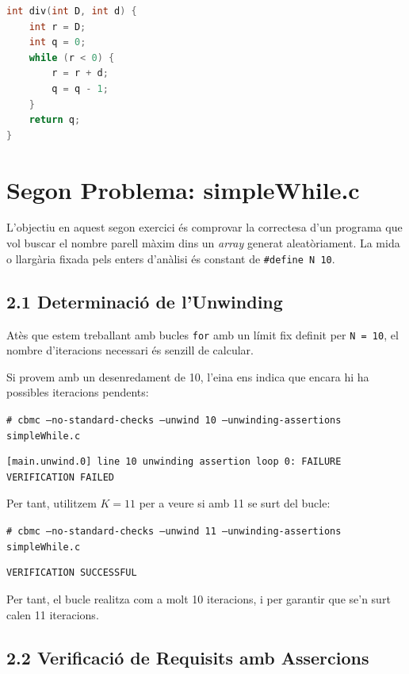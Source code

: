 \documentclass[12pt,a4paper]{article}
\begin{document}
\begin{lstlisting}[language=C]
int div(int D, int d) {
    int r = D;
    int q = 0;
    while (r < 0) {
        r = r + d;
        q = q - 1;
    }
    return q;
}
\end{lstlisting}

\section{Segon Problema: simpleWhile.c}

L'objectiu en aquest segon exercici és comprovar la correctesa d'un programa que vol buscar el nombre parell màxim dins un \textit{array} generat aleatòriament. La mida o llargària fixada pels enters d'anàlisi és constant de \texttt{\#define N 10}.

\subsection{2.1 Determinació de l'Unwinding}

Atès que estem treballant amb bucles \texttt{for} amb un límit fix definit per \texttt{N = 10}, el nombre d'iteracions necessari és senzill de calcular.

Si provem amb un desenredament de 10, l'eina ens indica que encara hi ha possibles iteracions pendents:
\begin{tcolorbox}[colback=black!85, coltext=white]
\texttt{\# cbmc --no-standard-checks --unwind 10 --unwinding-assertions simpleWhile.c}
\end{tcolorbox}
\begin{verbatim}
[main.unwind.0] line 10 unwinding assertion loop 0: FAILURE
VERIFICATION FAILED
\end{verbatim}

Per tant, utilitzem $K=11$ per a veure si amb 11 se surt del bucle: 
\begin{tcolorbox}[colback=black!85, coltext=white]
\texttt{\# cbmc --no-standard-checks --unwind 11 --unwinding-assertions simpleWhile.c}
\end{tcolorbox}
\begin{verbatim}
VERIFICATION SUCCESSFUL
\end{verbatim}
Per tant, el bucle realitza com a molt 10 iteracions, i per garantir que se'n surt calen 11 iteracions.

\subsection{2.2 Verificació de Requisits amb Assercions}
\end{document}
